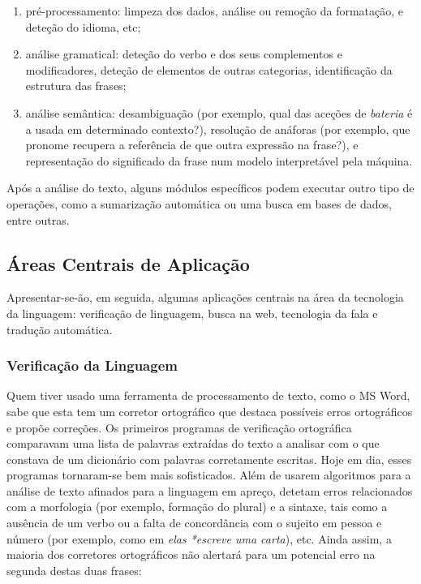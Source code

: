 \begin{multicols}{2}
\begin{enumerate}
  \item pré-processamento: limpeza dos dados, análise ou remoção da formatação, e deteção do idioma, etc; 
  \item análise gramatical: deteção do verbo e dos seus complementos e modificadores, deteção de elementos de outras categorias, identificação da estrutura das frases; 
  \item análise semântica: desambiguação (por exemplo, qual das aceções de \textit{bateria} é a usada em determinado contexto?), resolução de anáforas (por exemplo, que pronome recupera a referência de que outra expressão na frase?), e representação do significado da frase num modelo interpretável pela máquina.
\end{enumerate}

Após a análise do texto, alguns módulos específicos podem executar outro tipo de operações, como a sumarização automática ou uma busca em bases de dados, entre outras.


\subsection{Áreas Centrais de Aplicação} 

Apresentar-se-ão, em seguida, algumas aplicações centrais na área da tecnologia da linguagem: 
verificação de linguagem, busca na web, tecnologia da fala e tradução automática. 


\subsubsection{Verificação da Linguagem}

Quem tiver usado uma ferramenta de processamento de texto, como o MS Word, sabe que esta
tem um corretor ortográfico que destaca possíveis erros ortográficos e propõe correções. 
Os primeiros programas de verificação ortográfica comparavam uma lista de palavras extraídas
do texto a analisar com o que constava de um dicionário com palavras corretamente escritas. 
Hoje em dia, esses programas tornaram-se bem mais sofisticados. 
Além de usarem algoritmos para a análise de texto afinados para a linguagem em apreço, 
detetam erros relacionados com a morfologia (por exemplo, formação do plural) e a sintaxe, 
tais como a ausência de um verbo ou a falta de concordância com o sujeito em pessoa e número
(por exemplo, como em \textit{elas *escreve uma carta}), etc. 
Ainda assim, a maioria dos corretores ortográficos não alertará para um potencial
erro na segunda destas duas frases:
\\


\end{multicols}
